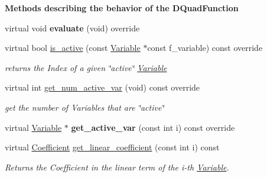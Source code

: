 \begin{Indent}\textbf{ Methods describing the behavior of the D\+Quad\+Function}\par
\begin{DoxyCompactItemize}
\item 
\mbox{\label{class_s_m_spp__di__unipi__it_1_1_d_quad_function_ab213cd0c00964b5e7827a3571887772a}} 
virtual void {\bfseries evaluate} (void) override
\item 
virtual bool \mbox{\hyperlink{class_s_m_spp__di__unipi__it_1_1_d_quad_function_a5412d6d119f09c9e958bcf0800fcdeaa}{is\+\_\+active}} (const \mbox{\hyperlink{class_s_m_spp__di__unipi__it_1_1_variable}{Variable}} $\ast$const f\+\_\+variable) const override
\begin{DoxyCompactList}\small\item\em returns the Index of a given \char`\"{}active\char`\"{} \mbox{\hyperlink{class_s_m_spp__di__unipi__it_1_1_variable}{Variable}} \end{DoxyCompactList}\item 
virtual int \mbox{\hyperlink{class_s_m_spp__di__unipi__it_1_1_d_quad_function_af7f92d9890df5e47c25215b99f97caef}{get\+\_\+num\+\_\+active\+\_\+var}} (void) const override
\begin{DoxyCompactList}\small\item\em get the number of Variables that are \char`\"{}active\char`\"{} \end{DoxyCompactList}\item 
\mbox{\label{class_s_m_spp__di__unipi__it_1_1_d_quad_function_a9e11c2f2bb3edbd2e2e5c9d529360cf7}} 
virtual \mbox{\hyperlink{class_s_m_spp__di__unipi__it_1_1_variable}{Variable}} $\ast$ {\bfseries get\+\_\+active\+\_\+var} (const int i) const override
\item 
virtual \mbox{\hyperlink{class_s_m_spp__di__unipi__it_1_1_d_quad_function_a1fa0f848dbb8d52dc62a1adfee1a1f90}{Coefficient}} \mbox{\hyperlink{class_s_m_spp__di__unipi__it_1_1_d_quad_function_a5891b5f43e335816627f514ef98f466d}{get\+\_\+linear\+\_\+coefficient}} (const int i) const
\begin{DoxyCompactList}\small\item\em Returns the Coefficient in the linear term of the i-\/th \mbox{\hyperlink{class_s_m_spp__di__unipi__it_1_1_variable}{Variable}}. \end{DoxyCompactList}\item 

\end{DoxyCompactItemize}
\end{Indent}
